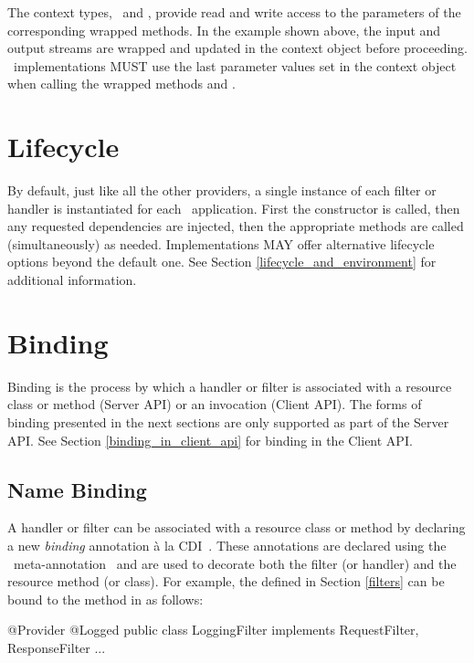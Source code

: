 The context types, \ReadFromHandlerContext\ and \WriteToHandlerContext, provide read and write access to the parameters of the corresponding wrapped methods. In the example shown above, the input and output streams are wrapped and updated in the context object before proceeding. \jaxrs\ implementations MUST use the last parameter values set in the context object when calling the wrapped methods  and .

\section{Lifecycle}

By default, just like all the other providers, a single instance of each filter or handler is instantiated for each \jaxrs\ application. First the constructor is called, then any requested dependencies are injected, then the appropriate methods are called (simultaneously) as needed. Implementations MAY offer alternative lifecycle options beyond the default one. See Section \ref{lifecycle_and_environment} for additional information.

\section{Binding}

Binding is the process by which a handler or filter is associated with a resource class or method (Server API) or an invocation (Client API). The forms of binding presented in the next sections are only supported as part of the Server API. See Section \ref{binding_in_client_api} for binding in the Client API.

\subsection{Name Binding}
\label{Name_Binding}

A handler or filter can be associated with a resource class or method by declaring a new \emph{binding} annotation \`{a} la CDI~\cite{jsr299}. These annotations are declared using the \jaxrs\ meta-annotation \NameBinding\ and are used to decorate both the filter (or handler) and the resource method (or class). For example, the  defined in Section \ref{filters} can be bound to the method  in  as follows:

\begin{listing}{1}
@Provider
@Logged
public class LoggingFilter implements RequestFilter, ResponseFilter {
    ...
}
\end{listing}

